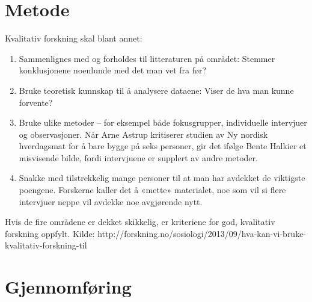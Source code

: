 \documentclass[main.tex]{subfiles}
\begin{document}
\section*{Metode}
\label{sec:2}

Kvalitativ forskning skal blant annet:
\begin{enumerate}
\item Sammenlignes med og forholdes til litteraturen på området: Stemmer konklusjonene noenlunde med det man vet fra før?
\item Bruke teoretisk kunnskap til å analysere dataene: Viser de hva man kunne forvente?
\item Bruke ulike metoder – for eksempel både fokusgrupper, individuelle intervjuer og observasjoner. Når Arne Astrup kritiserer studien av Ny nordisk hverdagsmat for å bare bygge på seks personer, gir det ifølge Bente Halkier et misvisende bilde, fordi intervjuene er supplert av andre metoder.
\item Snakke med tilstrekkelig mange personer til at man har avdekket de viktigste poengene. Forskerne kaller det å «mette» materialet, noe som vil si flere intervjuer neppe vil avdekke noe avgjørende nytt.
\end{enumerate}
Hvis de fire områdene er dekket skikkelig, er kriteriene for god, kvalitativ forskning oppfylt.
\newline
\newline
Kilde: http://forskning.no/sosiologi/2013/09/hva-kan-vi-bruke-kvalitativ-forskning-til

\section*{Gjennomføring}
\label{sec:3}
\end{document}
